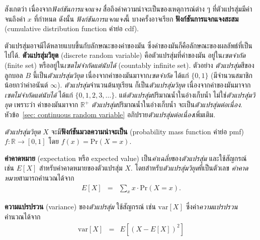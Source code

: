 สังเกตว่า เนื่องจาก\textit{ฟังก์ชันการแจกแจง} สื่อถึงค่าความน่าจะเป็นของเหตุการณ์ต่าง ๆ
ที่ตัวแปรสุ่มมีค่าจนถึงค่า $x$ ที่กำหนด
ดังนั้น%
\textit{ฟังก์ชันการแจกแจง}นี้
บางครั้งอาจเรียก
\textbf{ฟังก์ชันการแจกแจงสะสม} (cumulative distribution function คำย่อ cdf).

ตัวแปรสุ่มอาจมีได้หลายแบบขึ้นกับลักษณะของค่าของมัน ซึ่งค่าของมันก็คือลักษณะของผลลัพธ์ที่เป็นไปได้.
\textbf{ตัวแปรสุ่มวิยุต} (discrete random variable)
คือตัวแปรสุ่มที่ค่าของมัน อยู่ใน\textit{เซตจำกัด} (finite set) หรืออยู่ใน\textit{เซตไม่จำกัดแต่นับได้} (countably infinite set).
ตัวอย่าง \textit{ตัวแปรสุ่ม}สีของลูกบอล $B$ นี้เป็น\textit{ตัวแปรสุ่มวิยุต}
เนื่องจากค่าของมันมาจาก\textit{เซตจำกัด} ได้แก่ $\{0, 1\}$ (มีจำนวนสมาชิกน้อยกว่าค่าอนันต์ $\infty$).
\textit{ตัวแปรสุ่ม}จำนวนต้นทุเรียน ก็เป็น\textit{ตัวแปรสุ่มวิยุต}
เนื่องจากค่าของมันมาจาก\textit{เซตไม่จำกัดแต่นับได้} ได้แก่ $\{0, 1, 2, 3, \ldots \}$.
แต่\textit{ตัวแปรสุ่ม}ปริมาณน้ำในอ่างเก็บน้ำ ไม่ใช่\textit{ตัวแปรสุ่มวิยุต}
เพราะว่า ค่าของมันมาจาก $\mathbb{R}^+$ 
\textit{ตัวแปรสุ่ม}ปริมาณน้ำในอ่างเก็บน้ำ จะเป็น\textit{ตัวแปรสุ่มต่อเนื่อง}.
หัวข้อ~\ref{sec: continuous random variable} อภิปราย\textit{ตัวแปรสุ่มต่อเนื่อง}เพิ่มเติม.

\textit{ตัวแปรสุ่มวิยุต} $X$ จะมี\textbf{ฟังก์ชันมวลความน่าจะเป็น} (probability mass function คำย่อ pmf) $f: \mathbb{R} \rightarrow [0,1]$ โดย $f(x) = \mathrm{Pr}(X = x)$.


\textbf{ค่าคาดหมาย} (expectation หรือ expected value) 
เป็น\textit{ค่าเฉลี่ย}ของ\textit{ตัวแปรสุ่ม}
และใช้สัญกรณ์ เช่น $E[X]$
สำหรับค่าคาดหมายของตัวแปรสุ่ม $X$.
โดยสำหรับ\textit{ตัวแปรสุ่มวิยุต}ที่เป็นตัวเลข
\textit{ค่าคาดหมาย}สามารถคำนวณได้จาก
\begin{eqnarray}
E[X] &=& \sum_x x \cdot \mathrm{Pr}(X=x)
\label{eq: prob expectation}.
\end{eqnarray}


\textbf{ความแปรปรวน} (variance)
ของ\textit{ตัวแปรสุ่ม}
ใช้สัญกรณ์ เช่น
$\mathrm{var}[X]$
ซึ่งค่า\textit{ความแปรปรวน} คำนวณได้จาก
\begin{eqnarray}
\mathrm{var}[X] &=& 
E[(X -E[X])^2]
\label{eq: prob variance}
\end{eqnarray}

